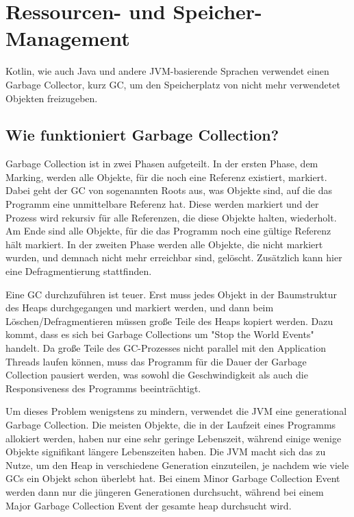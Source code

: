 
\vfill
\pagebreak

\section{Ressourcen- und Speicher-Management}\label{sec:resourcenmanagement}

\renewcommand{\kapitelautor}{Autor: Marvin Kurka}

Kotlin, wie auch Java und andere JVM-basierende Sprachen verwendet einen Garbage Collector, kurz GC, um den
Speicherplatz von nicht mehr verwendetet Objekten freizugeben.

\subsection{Wie funktioniert Garbage Collection?}

Garbage Collection ist in zwei Phasen aufgeteilt.
In der ersten Phase, dem Marking, werden alle Objekte, für die noch eine Referenz existiert, markiert.
Dabei geht der GC von sogenannten Roots aus, was Objekte sind, auf die das Programm eine unmittelbare
Referenz hat.
Diese werden markiert und der Prozess wird rekursiv für alle Referenzen, die diese Objekte halten, wiederholt.
Am Ende sind alle Objekte, für die das Programm noch eine gültige Referenz hält markiert.
In der zweiten Phase werden alle Objekte, die nicht markiert wurden, und demnach nicht mehr erreichbar sind, gelöscht.
Zusätzlich kann hier eine Defragmentierung stattfinden.

Eine GC durchzuführen ist teuer.
Erst muss jedes Objekt in der Baumstruktur des Heaps durchgegangen und markiert werden, und dann beim
Löschen/Defragmentieren müssen große Teile des Heaps kopiert werden.
Dazu kommt, dass es sich bei Garbage Collections um "Stop the World Events" handelt.
Da große Teile des GC-Prozesses nicht parallel mit den Application Threads laufen können, muss das
Programm für die Dauer der Garbage Collection pausiert werden, was sowohl die Geschwindigkeit als auch die
Responsiveness des Programms beeinträchtigt.

Um dieses Problem wenigstens zu mindern, verwendet die JVM eine generational Garbage Collection.
Die meisten Objekte, die in der Laufzeit eines Programms allokiert werden, haben nur eine sehr geringe Lebenszeit,
während einige wenige Objekte signifikant längere Lebenszeiten haben.
Die JVM macht sich das zu Nutze, um den Heap in verschiedene Generation einzuteilen, je nachdem wie viele GCs
ein Objekt schon überlebt hat.
Bei einem Minor Garbage Collection Event werden dann nur die jüngeren Generationen durchsucht, während bei einem
Major Garbage Collection Event der gesamte heap durchsucht wird.

